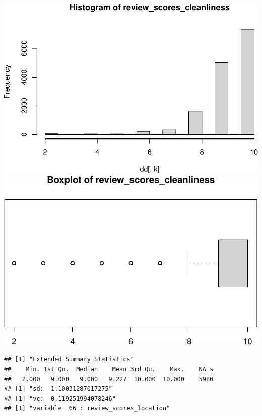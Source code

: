 \includegraphics{anal_files/figure-latex/unnamed-chunk-7-50.pdf}
\includegraphics{anal_files/figure-latex/unnamed-chunk-7-51.pdf}

\begin{verbatim}
## [1] "Extended Summary Statistics"
##    Min. 1st Qu.  Median    Mean 3rd Qu.    Max.    NA's 
##   2.000   9.000   9.000   9.227  10.000  10.000    5980 
## [1] "sd:  1.10031287017275"
## [1] "vc:  0.119251994078246"
## [1] "variable  66 : review_scores_location"
\end{verbatim}

